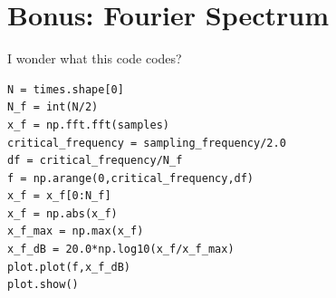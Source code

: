\documentclass{article}
\begin{document}
\section{Bonus: Fourier Spectrum}

I wonder what this code codes?

\begin{verbatim}
N = times.shape[0]
N_f = int(N/2)
x_f = np.fft.fft(samples)
critical_frequency = sampling_frequency/2.0
df = critical_frequency/N_f
f = np.arange(0,critical_frequency,df)
x_f = x_f[0:N_f]
x_f = np.abs(x_f)
x_f_max = np.max(x_f)
x_f_dB = 20.0*np.log10(x_f/x_f_max)
plot.plot(f,x_f_dB)
plot.show()
\end{verbatim}
\end{document}
